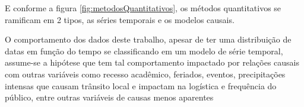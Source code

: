           \begin{figure}[H]
          \end{figure}

E conforme a figura \ref{fig:metodosQuantitativos}, os métodos quantitativos se ramificam em 2 tipos, as séries temporais e os modelos causais.

          \begin{figure}[H]
          \end{figure}

O comportamento dos dados deste trabalho, apesar de ter uma distribuição de datas em função do tempo se classificando em um modelo de série temporal, assume-se a hipótese que tem tal comportamento impactado por relações causais com outras variáveis como recesso acadêmico, feriados, eventos, precipitações intensas que causam trânsito local e impactam na logística e frequência do público, entre outras variáveis de causas menos aparentes

